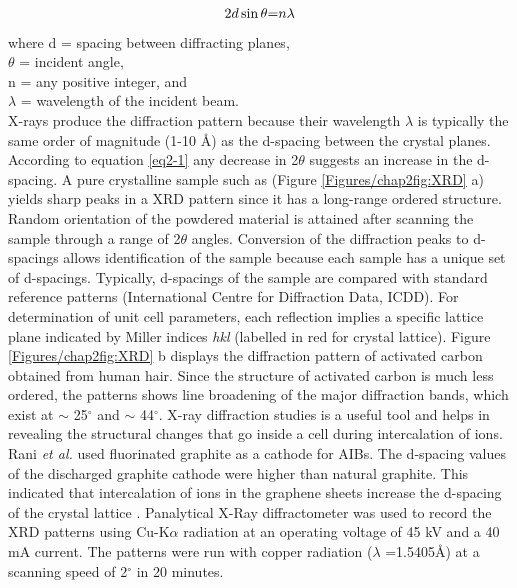  \begin{equation} \label{eq2-1}
     2d\sin\theta \text= n{\lambda}
 \end{equation}
 where d = spacing between diffracting planes,\\
$\theta$ = incident angle,\\ 
n = any positive integer, and \\
$\lambda$ = wavelength of the incident beam.\\
X-rays produce the diffraction pattern because their wavelength $\lambda$ is typically the same order of magnitude (1-10 \AA) as the d-spacing between the crystal planes. According to equation \ref{eq2-1} any decrease in 2$\theta$ suggests an increase in the d-spacing. A pure crystalline sample such as  (Figure \ref{Figures/chap2fig:XRD} a) yields sharp peaks in a XRD pattern since it has a long-range ordered structure. Random orientation of the powdered material is attained after scanning the sample through a range of 2$\theta$ angles. Conversion of the diffraction peaks to d-spacings allows identification of the sample because each sample has a unique set of d-spacings. Typically, d-spacings of the sample are compared with standard reference patterns (International Centre for Diffraction Data, ICDD). For determination of unit cell parameters, each reflection implies a specific lattice plane indicated by Miller indices \textit{hkl} (labelled in red  for  crystal lattice). Figure \ref{Figures/chap2fig:XRD} b displays the diffraction pattern of activated carbon obtained from human hair. Since the structure of activated carbon is much less ordered, the patterns shows line broadening of the major diffraction bands, which exist at $\sim$ 25$^{\circ}$  and $\sim$ 44$^{\circ}$.
X-ray diffraction studies is a useful tool and helps in revealing the structural changes that go inside a cell during intercalation of ions. Rani \textit{et al.} used fluorinated graphite as a cathode for AIBs. The d-spacing values of the discharged graphite cathode were higher than natural graphite. This indicated that intercalation of  ions in the graphene sheets increase the d-spacing of the crystal lattice \cite{rani_fluorinated_2013}.
Panalytical X-Ray diffractometer was used to record the XRD patterns using Cu-K$\alpha$ radiation at an operating voltage of 45 kV and a 40 mA current. The patterns were run with copper radiation ($\lambda$ =1.5405\AA) at a scanning speed of 2$^{\circ}$ in 20 minutes. 

